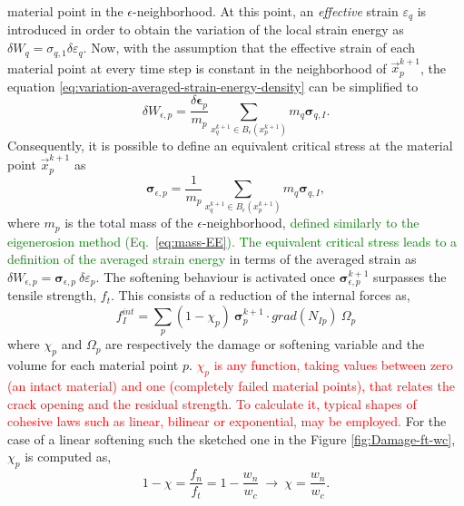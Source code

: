 \message{ !name(2020_EFM_MPM_Eigensoftening.tex)}\documentclass[preprint,12pt,a4paper]{elsarticle}
\newcommand{\tens}[1]{
  \ensuremath{\mathbf{{#1}}}
}
\newcommand\Grad[1]{grad({#1})}
\newcommand{\PNA}[1]{
  \textcolor{red}{{#1}}
}
\newcommand{\DM}[1]{
  \textcolor{green}{{#1}}
}
\begin{document}
material point in the $\epsilon$-neighborhood. At this point, an \textit{effective} strain $\varepsilon_q$ is introduced in order to obtain the variation of
the local strain energy as $\delta W_q = \sigma_{q,1}
\delta\varepsilon_q$. Now, with the assumption that the effective
strain of each material point at every time step is constant in the
neighborhood of $\vec{x}_p^{k+1}$, the equation 
\eqref{eq:variation-averaged-strain-energy-density} can be simplified
 to
\begin{equation}
  \label{eq:variation-averaged-strain-energy-density-simpli}
  \delta W_{\epsilon,p} =
  \frac{\delta \tens{\epsilon}_p}{m_p} \sum_{x_q^{k+1} \in
  B_{\epsilon}(x_p^{k+1})} m_q \tens{\sigma}_{q,I}. 
\end{equation}
Consequently, it is possible to define an equivalent critical stress at the
material point $\vec{x}_p^{k+1}$ as
\begin{equation}
  \label{eq:equivalent-critical-stress}
  \tens{\sigma}_{\epsilon,p} =
  \frac{1}{m_p} \sum_{x_q^{k+1} \in
  B_{\epsilon}(x_p^{k+1})} m_q \tens{\sigma}_{q,I}, 
\end{equation}
where $m_p$ is the total mass of the
$\epsilon$-neighborhood,\DM{defined similarly to the eigenerosion
  method (Eq.~\eqref{eq:mass-EE}). The equivalent critical stress
  leads to a definition of the   averaged strain energy} in terms of the averaged
strain as $\delta W_{\epsilon,p} =
 \tens{\sigma}_{\epsilon,p}\ \delta\varepsilon_p$. The softening behaviour is
activated once $\tens{\sigma}_{\epsilon,p}^{k+1}$ surpasses the
tensile strength, $f_t$. This consists of a reduction of the internal
forces as, 
 \begin{equation}
   \label{eq:f-int-damaged}
   f^{int}_I = \sum_p (1 - \chi_p)\ \tens{\sigma}_{p}^{k+1} \cdot
   \Grad{N_{Ip}}\ \Omega_p
 \end{equation}
where $\chi_p$ and $\Omega_p$ are respectively the damage or softening
variable and the volume for each material point $p$. \PNA{$\chi_p$ is any function, taking
values between zero (an intact material) and one (completely failed
material points), that relates the crack opening and the residual strength. To calculate it, typical shapes of cohesive laws such as linear, bilinear or exponential, may be employed.} For the case of a linear softening such the sketched one in the Figure \ref{fig:Damage-ft-wc}, $\chi_p$ is computed as,
 \begin{equation}
   \label{eq:damaged-variable-chi}
   1 - \chi = \frac{f_n}{f_t} = 1 - \frac{w_n}{w_c}\ \rightarrow\ \chi
   = \frac{w_n}{w_c}.
 \end{equation}
\end{document}
